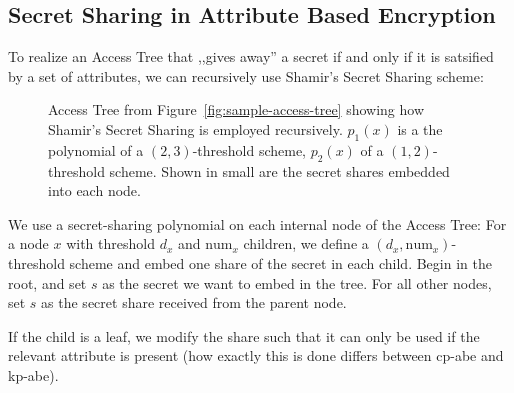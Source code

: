 \subsection{Secret Sharing in Attribute Based Encryption}\label{sec:lss-in-access-trees}
To realize an Access Tree that ,,gives away'' a secret if and only if it is satsified by a set of attributes, we can recursively use Shamir's Secret Sharing scheme:

\begin{figure}
    \centering
    \caption[Shamir's Secret sharing in Access Trees]{
        Access Tree from Figure~\ref{fig:sample-access-tree} showing how Shamir's Secret Sharing is employed recursively.
        $p_1(x)$ is a the polynomial of a $(2,3)$-threshold scheme, $p_2(x)$ of a $(1,2)$-threshold scheme.
        Shown in small are the secret shares embedded into each node.
    }
    \label{fig:sample-access-tree-shamir}
\end{figure}

We use a secret-sharing polynomial on each internal node of the Access Tree:
For a node $x$ with threshold $d_x$ and $\text{num}_x$ children, we define a $(d_x, \text{num}_x)$-threshold scheme and embed one share of the secret in each child.
Begin in the root, and set $s$ as the secret we want to embed in the tree. For all other nodes, set $s$ as the secret share received from the parent node.

If the child is a leaf, we modify the share such that it can only be used if the relevant attribute is present (how exactly this is done differs between \acrshort{cp-abe} and \acrshort{kp-abe}).

